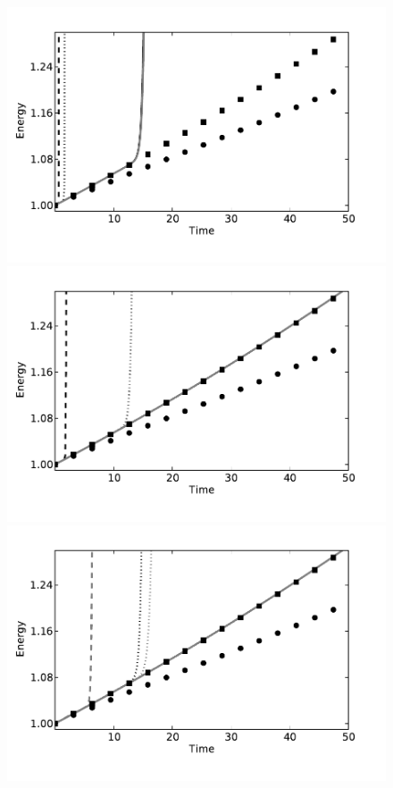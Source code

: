\begin{figure}
  \centering
  \includegraphics[width=\twofigs]{chapters/mortensen/pdf/OS_energy_cfl_0_1_model_1.pdf}
  \includegraphics[width=\twofigs]{chapters/mortensen/pdf/OS_energy_cfl_0_1_model_0.pdf} \\
  \includegraphics[width=\twofigs]{chapters/mortensen/pdf/OS_energy_cfl_0_05_model_1.pdf}

\end{figure}
